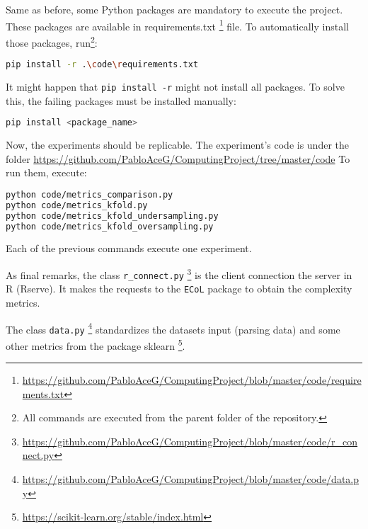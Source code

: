 Same as before, some Python packages are mandatory to execute the project. These
packages are available in requirements.txt
\footnote{\url{https://github.com/PabloAceG/ComputingProject/blob/master/code/requirements.txt}} 
file. To automatically install those packages, run\footnote{All commands are 
executed from the parent folder of the repository.}:

\begin{lstlisting}[language=bash]
pip install -r .\code\requirements.txt
\end{lstlisting}

It might happen that \lstinline{pip install -r} might not install all packages. 
To solve this, the failing packages must be installed manually:

\begin{lstlisting}[language=bash]
pip install <package_name>
\end{lstlisting}

Now, the experiments should be replicable. The experiment's code is under the 
folder \url{https://github.com/PabloAceG/ComputingProject/tree/master/code}
To run them, execute: 

\begin{lstlisting}[language=bash]
python code/metrics_comparison.py
python code/metrics_kfold.py
python code/metrics_kfold_undersampling.py
python code/metrics_kfold_oversampling.py
\end{lstlisting}

Each of the previous commands execute one experiment.

As final remarks, the class \lstinline{r_connect.py}
\footnote{\url{https://github.com/PabloAceG/ComputingProject/blob/master/code/r_connect.py}}
is the client connection the server in R (Rserve). It makes the requests to the 
\lstinline{ECoL} package to obtain the complexity metrics.

The class \lstinline{data.py}
\footnote{\url{https://github.com/PabloAceG/ComputingProject/blob/master/code/data.py}}
standardizes the datasets input (parsing data) and some other metrics from the 
package sklearn \footnote{\url{https://scikit-learn.org/stable/index.html}}.

